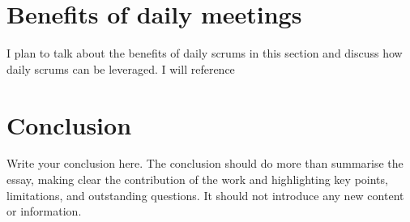 \documentclass{scrartcl}
\begin{document}
\section{Benefits of daily meetings}

I plan to talk about the benefits of daily scrums in this section and discuss how daily scrums can be leveraged. I will reference \cite{Distributed,SupportingScrum,SoftwareProjects} 

\section{Conclusion}

Write your conclusion here. The conclusion should do more than summarise the essay, making clear the contribution of the work and highlighting key points, limitations, and outstanding questions. It should not introduce any new content or information.



\end{document}

